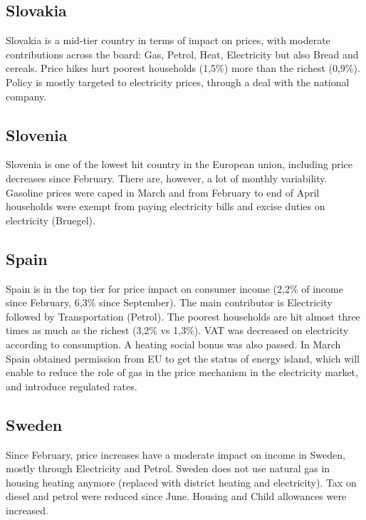 \documentclass[
  9pt,
  a4paper,
  numbers=noendperiod,
  DIV=12]{scrartcl}
\begin{document}
\hypertarget{slovakia}{%
\subsection{Slovakia}\label{slovakia}}

Slovakia is a mid-tier country in terms of impact on prices, with
moderate contributions across the board: Gas, Petrol, Heat, Electricity
but also Bread and cereals. Price hikes hurt poorest households (1,5\%)
more than the richest (0,9\%). Policy is mostly targeted to electricity
prices, through a deal with the national company.

\hypertarget{slovenia}{%
\subsection{Slovenia}\label{slovenia}}

Slovenia is one of the lowest hit country in the European union,
including price decreases since February. There are, however, a lot of
monthly variability. Gasoline prices were caped in March and from
February to end of April households were exempt from paying electricity
bills and excise duties on electricity (Bruegel).

\hypertarget{spain}{%
\subsection{Spain}\label{spain}}

Spain is in the top tier for price impact on consumer income (2,2\% of
income since February, 6,3\% since September). The main contributor is
Electricity followed by Transportation (Petrol). The poorest households
are hit almost three times as much as the richest (3,2\% vs 1,3\%). VAT
was decreased on electricity according to consumption. A heating social
bonus was also passed. In March Spain obtained permission from EU to get
the status of energy island, which will enable to reduce the role of gas
in the price mechanism in the electricity market, and introduce
regulated rates.

\hypertarget{sweden}{%
\subsection{Sweden}\label{sweden}}

Since February, price increases have a moderate impact on income in
Sweden, mostly through Electricity and Petrol. Sweden does not use
natural gas in housing heating anymore (replaced with district heating
and electricity). Tax on diesel and petrol were reduced since June.
Housing and Child allowances were increased.
\end{document}
